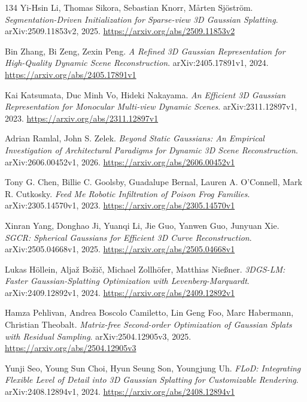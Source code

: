 \documentclass[11pt,a4paper]{article}
\begin{document}
\begin{thebibliography}{134}
Yi-Hsin Li, Thomas Sikora, Sebastian Knorr, M\r{a}rten Sj\"{o}str\"{o}m.
\newblock \emph{Segmentation-Driven Initialization for Sparse-view 3D Gaussian Splatting}.
\newblock arXiv:2509.11853v2, 2025.
\newblock \url{https://arxiv.org/abs/2509.11853v2}

Bin Zhang, Bi Zeng, Zexin Peng.
\newblock \emph{A Refined 3D Gaussian Representation for High-Quality Dynamic Scene Reconstruction}.
\newblock arXiv:2405.17891v1, 2024.
\newblock \url{https://arxiv.org/abs/2405.17891v1}

Kai Katsumata, Duc Minh Vo, Hideki Nakayama.
\newblock \emph{An Efficient 3D Gaussian Representation for Monocular Multi-view Dynamic Scenes}.
\newblock arXiv:2311.12897v1, 2023.
\newblock \url{https://arxiv.org/abs/2311.12897v1}

Adrian Ramlal, John S. Zelek.
\newblock \emph{Beyond Static Gaussians: An Empirical Investigation of Architectural Paradigms for Dynamic 3D Scene Reconstruction}.
\newblock arXiv:2606.00452v1, 2026.
\newblock \url{https://arxiv.org/abs/2606.00452v1}

Tony G. Chen, Billie C. Goolsby, Guadalupe Bernal, Lauren A. O'Connell, Mark R. Cutkosky.
\newblock \emph{Feed Me Robotic Infiltration of Poison Frog Families}.
\newblock arXiv:2305.14570v1, 2023.
\newblock \url{https://arxiv.org/abs/2305.14570v1}

Xinran Yang, Donghao Ji, Yuanqi Li, Jie Guo, Yanwen Guo, Junyuan Xie.
\newblock \emph{SGCR: Spherical Gaussians for Efficient 3D Curve Reconstruction}.
\newblock arXiv:2505.04668v1, 2025.
\newblock \url{https://arxiv.org/abs/2505.04668v1}

Lukas H\"{o}llein, Alja\v{z} Bo\v{z}i\v{c}, Michael Zollh\"{o}fer, Matthias Nie\ss{}ner.
\newblock \emph{3DGS-LM: Faster Gaussian-Splatting Optimization with Levenberg-Marquardt}.
\newblock arXiv:2409.12892v1, 2024.
\newblock \url{https://arxiv.org/abs/2409.12892v1}

Hamza Pehlivan, Andrea Boscolo Camiletto, Lin Geng Foo, Marc Habermann, Christian Theobalt.
\newblock \emph{Matrix-free Second-order Optimization of Gaussian Splats with Residual Sampling}.
\newblock arXiv:2504.12905v3, 2025.
\newblock \url{https://arxiv.org/abs/2504.12905v3}

Yunji Seo, Young Sun Choi, Hyun Seung Son, Youngjung Uh.
\newblock \emph{FLoD: Integrating Flexible Level of Detail into 3D Gaussian Splatting for Customizable Rendering}.
\newblock arXiv:2408.12894v1, 2024.
\newblock \url{https://arxiv.org/abs/2408.12894v1}


\end{thebibliography}
\end{document}
